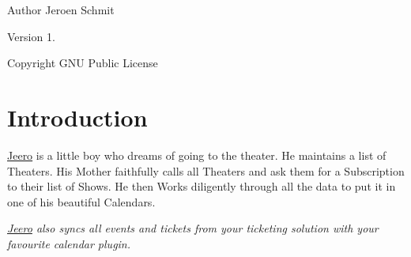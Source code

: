 \begin{DoxyAuthor}{Author}
Jeroen Schmit 
\end{DoxyAuthor}
\begin{DoxyVersion}{Version}
1. 
\end{DoxyVersion}
\begin{DoxyCopyright}{Copyright}
G\+NU Public License
\end{DoxyCopyright}
\hypertarget{index_intro}{}\section{Introduction}\label{index_intro}
\hyperlink{namespaceJeero}{Jeero} is a little boy who dreams of going to the theater. He maintains a list of Theaters. His Mother faithfully calls all Theaters and ask them for a Subscription to their list of Shows. He then Works diligently through all the data to put it in one of his beautiful Calendars.

{\itshape \hyperlink{namespaceJeero}{Jeero} also syncs all events and tickets from your ticketing solution with your favourite calendar plugin.} 